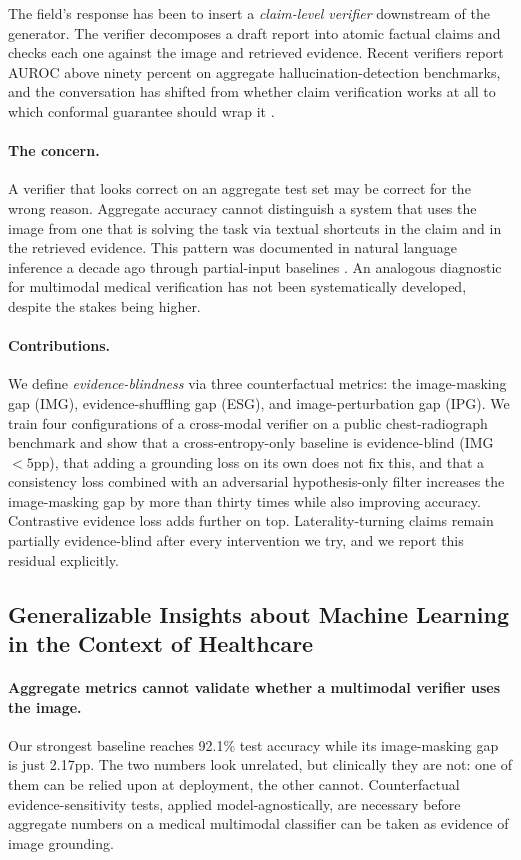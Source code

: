 \documentclass[pmlr]{jmlr}
\begin{document}
The field's response has been to insert a \emph{claim-level verifier} downstream of the generator. The verifier decomposes a draft report into atomic factual claims and checks each one against the image and retrieved evidence. Recent verifiers report AUROC above ninety percent on aggregate hallucination-detection benchmarks, and the conversation has shifted from whether claim verification works at all to which conformal guarantee should wrap it \citep{mohri2024language,angelopoulos2021gentle}.

\paragraph{The concern.} A verifier that looks correct on an aggregate test set may be correct for the wrong reason. Aggregate accuracy cannot distinguish a system that uses the image from one that is solving the task via textual shortcuts in the claim and in the retrieved evidence. This pattern was documented in natural language inference a decade ago through partial-input baselines \citep{gururangan2018annotation,poliak2018hypothesis}. An analogous diagnostic for multimodal medical verification has not been systematically developed, despite the stakes being higher.

\paragraph{Contributions.} We define \emph{evidence-blindness} via three counterfactual metrics: the image-masking gap (IMG), evidence-shuffling gap (ESG), and image-perturbation gap (IPG). We train four configurations of a cross-modal verifier on a public chest-radiograph benchmark and show that a cross-entropy-only baseline is evidence-blind (IMG $<5$pp), that adding a grounding loss on its own does not fix this, and that a consistency loss combined with an adversarial hypothesis-only filter increases the image-masking gap by more than thirty times while also improving accuracy. Contrastive evidence loss adds further on top. Laterality-turning claims remain partially evidence-blind after every intervention we try, and we report this residual explicitly.

\subsection*{Generalizable Insights about Machine Learning in the Context of Healthcare}

\paragraph{Aggregate metrics cannot validate whether a multimodal verifier uses the image.} Our strongest baseline reaches 92.1\% test accuracy while its image-masking gap is just 2.17pp. The two numbers look unrelated, but clinically they are not: one of them can be relied upon at deployment, the other cannot. Counterfactual evidence-sensitivity tests, applied model-agnostically, are necessary before aggregate numbers on a medical multimodal classifier can be taken as evidence of image grounding.
\end{document}
